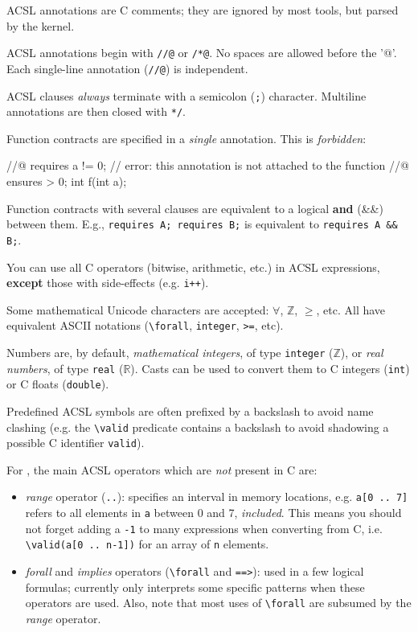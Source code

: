 \documentclass{frama-c-book}
\begin{document}
ACSL annotations are C comments; they are ignored by most tools, but parsed
by the \FramaC kernel.

ACSL annotations begin with \texttt{//@} or \texttt{/*@}. No spaces are allowed
before the '@'. Each single-line annotation (\texttt{//@}) is independent.

ACSL clauses {\em always} terminate with a semicolon (\texttt{;}) character.
Multiline annotations are then closed with \texttt{*/}.

Function contracts are specified in a {\em single} annotation.
This is {\em forbidden}:

\begin{listing-nonumber}
//@ requires a != 0; // error: this annotation is not attached to the function
//@ ensures \result > 0;
int f(int a);
\end{listing-nonumber}

Function contracts with several clauses are equivalent to a logical
\textbf{and} (\&\&) between them.
E.g., \verb+requires A; requires B;+ is equivalent to \verb+requires A && B;+.

You can use all C operators (bitwise, arithmetic, etc.) in ACSL expressions,
\textbf{except} those with side-effects (e.g. \texttt{i++}).

Some mathematical Unicode characters are accepted:
$\forall$, $\mathbb{Z}$, $\geq$, etc. All have equivalent ASCII notations
(\verb+\forall+, \texttt{integer}, \texttt{>=}, etc).

Numbers are, by default, {\em mathematical integers}, of type \texttt{integer}
(\texttt{$\mathbb{Z}$}), or {\em real numbers}, of type
\texttt{real} (\texttt{$\mathbb{R}$}). Casts can be used to convert them to
C integers (\texttt{int}) or C floats (\texttt{double}).

Predefined ACSL symbols are often prefixed by a backslash to avoid name
clashing (e.g. the \verb+\valid+ predicate contains a
backslash to avoid shadowing a possible C identifier \texttt{valid}).

For \Eva{}, the main ACSL operators which are {\em not} present in C are:

\begin{itemize}
\item {\em range} operator (\texttt{..}): specifies an interval in memory
  locations, e.g. \texttt{a[0 .. 7]} refers to all elements in \texttt{a}
  between 0 and 7, {\em included}. This means you should not forget adding a
  \texttt{-1} to many expressions when converting from C,
  i.e. \verb+\valid(a[0 .. n-1])+ for an array of \texttt{n} elements.
\item {\em forall} and {\em implies} operators (\verb+\forall+
  and \texttt{==>}): used in a few logical formulas; \Eva{} currently only
  interprets some specific patterns when these operators are used.
  Also, note that most uses of \verb+\forall+ are subsumed by the {\em range}
  operator.
\end{itemize}
\end{document}
